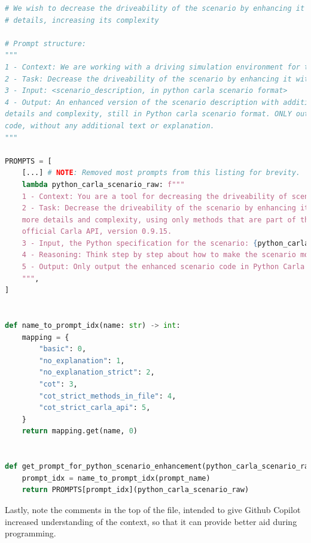 \begin{lstlisting}[caption={experiments/testbed/prompts.py, The implementation of a prompt testbed for executing prompts.}, label={lst:odinPromptTestbed}, language={Python}]
# We wish to decrease the driveability of the scenario by enhancing it with more
# details, increasing its complexity

# Prompt structure:
"""
1 - Context: We are working with a driving simulation environment for the Carla simulator.
2 - Task: Decrease the driveability of the scenario by enhancing it with more details and complexity.
3 - Input: <scenario_description, in python carla scenario format>
4 - Output: An enhanced version of the scenario description with additional
details and complexity, still in Python carla scenario format. ONLY output the
code, without any additional text or explanation.
"""

PROMPTS = [
    [...] # NOTE: Removed most prompts from this listing for brevity.
    lambda python_carla_scenario_raw: f"""
    1 - Context: You are a tool for decreasing the driveability of scenarios in the driving simulator Carla.
    2 - Task: Decrease the driveability of the scenario by enhancing it with
    more details and complexity, using only methods that are part of the
    official Carla API, version 0.9.15.
    3 - Input, the Python specification for the scenario: {python_carla_scenario_raw}
    4 - Reasoning: Think step by step about how to make the scenario more complex and less driveable, considering possible obstacles, traffic, weather, and other factors using only the official Carla API.
    5 - Output: Only output the enhanced scenario code in Python Carla scenario format, with no additional text or explanation.
    """,
]


def name_to_prompt_idx(name: str) -> int:
    mapping = {
        "basic": 0,
        "no_explanation": 1,
        "no_explanation_strict": 2,
        "cot": 3,
        "cot_strict_methods_in_file": 4,
        "cot_strict_carla_api": 5,
    }
    return mapping.get(name, 0)


def get_prompt_for_python_scenario_enhancement(python_carla_scenario_raw: str, prompt_name: str) -> str:
    prompt_idx = name_to_prompt_idx(prompt_name)
    return PROMPTS[prompt_idx](python_carla_scenario_raw)

\end{lstlisting}

Lastly, note the comments in the top of the file, intended to give Github
Copilot increased understanding of the context, so that it can provide better
aid during programming.


